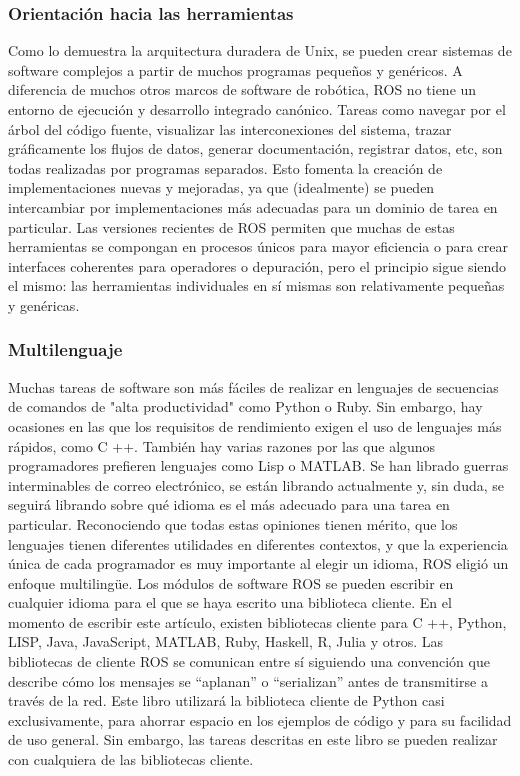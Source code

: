         \subsubsection{Orientación hacia las herramientas}
        
            Como lo demuestra la arquitectura duradera de Unix, se pueden crear sistemas de software complejos a partir de muchos programas pequeños y genéricos. A diferencia de muchos otros marcos de software de robótica, ROS no tiene un entorno de ejecución y desarrollo integrado canónico. Tareas como navegar por el árbol del código fuente, visualizar las interconexiones del sistema, trazar gráficamente los flujos de datos, generar documentación, registrar datos, etc, son todas realizadas por programas separados. Esto fomenta la creación de implementaciones nuevas y mejoradas, ya que (idealmente) se pueden intercambiar por implementaciones más adecuadas para un dominio de tarea en particular. Las versiones recientes de ROS permiten que muchas de estas herramientas se compongan en procesos únicos para mayor eficiencia o para crear interfaces coherentes para operadores o depuración, pero el principio sigue siendo el mismo: las herramientas individuales en sí mismas son relativamente pequeñas y genéricas.
            
        \subsubsection{Multilenguaje}
        
            Muchas tareas de software son más fáciles de realizar en lenguajes de secuencias de comandos de "alta productividad" como Python o Ruby. Sin embargo, hay ocasiones en las que los requisitos de rendimiento exigen el uso de lenguajes más rápidos, como C ++. También hay varias razones por las que algunos programadores prefieren lenguajes como Lisp o MATLAB. Se han librado guerras interminables de correo electrónico, se están librando actualmente y, sin duda, se seguirá librando sobre qué idioma es el más adecuado para una tarea en particular. Reconociendo que todas estas opiniones tienen mérito, que los lenguajes tienen diferentes utilidades en diferentes contextos, y que la experiencia única de cada programador es muy importante al elegir un idioma, ROS eligió un enfoque multilingüe. Los módulos de software ROS se pueden escribir en cualquier idioma para el que se haya escrito una biblioteca cliente. En el momento de escribir este artículo, existen bibliotecas cliente para C ++, Python, LISP, Java, JavaScript, MATLAB, Ruby, Haskell, R, Julia y otros. Las bibliotecas de cliente ROS se comunican entre sí siguiendo una convención que describe cómo los mensajes se ``aplanan'' o ``serializan'' antes de transmitirse a través de la red. Este libro utilizará la biblioteca cliente de Python casi exclusivamente, para ahorrar espacio en los ejemplos de código y para su facilidad de uso general. Sin embargo, las tareas descritas en este libro se pueden realizar con cualquiera de las bibliotecas cliente.
            
